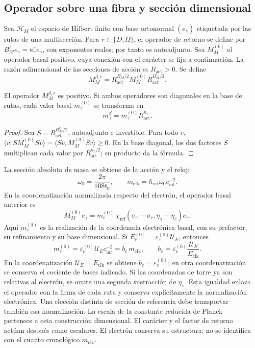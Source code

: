 \subsection{Operador sobre una fibra y sección dimensional}

Sea \(\mathscr H_M\) el espacio de Hilbert finito con base ortonormal
\((e_\gamma)\) etiquetada por las rutas de una multisección. Para
\(r\in\{D,\Omega\}\), el operador de retorno se define por
\(B_M^re_\gamma=\kappa_\gamma^re_\gamma\), con exponentes reales;
por tanto es autoadjunto. Sea \(M_M^{(0)}\) el operador basal positivo,
cuya conexión con el carácter se fija a continuación.
La razón adimensional de las
secciones de acción es \(R_{\mathrm{act}}>0\). Se define
\[
 M_M^{\beta,r}=R_{\mathrm{act}}^{B_M^r/2}
 M_M^{(0)}R_{\mathrm{act}}^{B_M^r/2}.
\]

\begin{proposition}
El operador \(M_M^{\beta,r}\) es positivo. Si ambos operadores son
diagonales en la base de rutas, cada valor basal \(m_\gamma^{(0)}\)
se transforma en
\[
 m_\gamma^\beta=m_\gamma^{(0)}R_{\mathrm{act}}^{\kappa_\gamma}.
\]
\end{proposition}
\begin{proof}
Sea \(S=R_{\mathrm{act}}^{B_M^r/2}\), autoadjunto e invertible.
Para todo \(v\),
\(\langle v,SM_M^{(0)}Sv\rangle=\langle Sv,M_M^{(0)}Sv\rangle\ge0\).
En la base diagonal, los dos factores \(S\) multiplican cada valor
por \(R_{\mathrm{act}}^{\kappa_\gamma/2}\); su producto da la fórmula.
\end{proof}

La sección absoluta de masa se obtiene de la acción y el reloj:
\[
 \omega_0=\frac{2\pi}{108t_0},\qquad
m_{\mathrm{clk}}=\hbar_{\mathrm{ret}}\omega_0c_{\mathrm{int}}^{-2}.
\]
En la coordenatización normalizada respecto del electrón, el operador basal anterior es
\[
 M_M^{(0)}e_\gamma
 =m_e^{(0)}\,
   \chi_{\mathrm{ref}}(\sigma_\gamma-\sigma_e,
                       \eta_\gamma-\eta_e)e_\gamma.
\]
Aquí \(m_e^{(0)}\) es la realización de la coordenada electrónica
basal, con su prefactor, su refinamiento y su base dimensional.
Si \(E_e^{(0)}=\varepsilon_e^{(0)}\mathcal U_E\), entonces
\[
 m_e^{(0)}=\varepsilon_e^{(0)}\mathcal U_Ec_{\mathrm{int}}^{-2}
 =b_e\,m_{\mathrm{clk}},\qquad
 b_e=\varepsilon_e^{(0)}\frac{\mathcal U_E}{E_{\mathrm{clk}}}.
\]
En la coordenatización \(\mathcal U_E=E_{\mathrm{clk}}\) se obtiene
\(b_e=\varepsilon_e^{(0)}\); en otra coordenatización se conserva el cociente
de bases indicado. Si las coordenadas de torre ya son
relativas al electrón, se omite una segunda sustracción de \(\eta_e\).
Esta igualdad enlaza el operador con la firma de cada ruta y conserva
explícitamente la normalización electrónica. Una elección distinta de
sección de referencia debe transportar también esa normalización.
La escala de la constante reducida de Planck pertenece a esta construcción
dimensional. El carácter y el factor de retorno actúan después como
escalares. El electrón conserva su estructura: no se identifica con el
cuanto cronológico \(m_{\mathrm{clk}}\).

